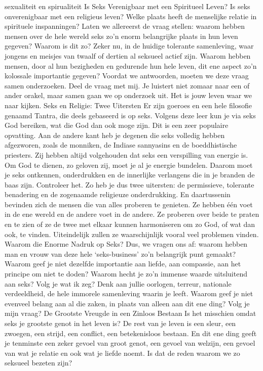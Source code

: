 sexualiteit en spirualiteit
Is Seks Verenigbaar met een Spiritueel Leven?
Is seks onverenigbaar met een religieus leven? Welke plaats heeft de menselijke relatie in spirituele inspanningen?
Laten we allereerst de vraag stellen: waarom hebben mensen over de hele wereld seks zo’n enorm belangrijke plaats in hun leven gegeven? Waarom is dit zo? Zeker nu, in de huidige tolerante samenleving, waar jongens en meisjes van twaalf of dertien al seksueel actief zijn. Waarom hebben mensen, door al hun bezigheden en gedurende hun hele leven, dit ene aspect zo’n kolossale importantie gegeven?
Voordat we antwoorden, moeten we deze vraag samen onderzoeken. Deel de vraag met mij. Je luistert niet zomaar naar een of ander orakel, maar samen gaan we op onderzoek uit. Het is jouw leven waar we naar kijken.
Seks en Religie: Twee Uitersten
Er zijn goeroes en een hele filosofie genaamd Tantra, die deels gebaseerd is op seks. Volgens deze leer kun je via seks God bereiken, wat die God dan ook moge zijn. Dit is een zeer populaire opvatting.
Aan de andere kant heb je degenen die seks volledig hebben afgezworen, zoals de monniken, de Indiase sannyasins en de boeddhistische priesters. Zij hebben altijd volgehouden dat seks een verspilling van energie is. Om God te dienen, zo geloven zij, moet je al je energie bundelen. Daarom moet je seks ontkennen, onderdrukken en de innerlijke verlangens die in je branden de baas zijn. Controleer het.
Zo heb je dus twee uitersten: de permissieve, tolerante benadering en de zogenaamde religieuze onderdrukking. En daartussenin bevinden zich de mensen die van alles proberen te genieten. Ze hebben één voet in de ene wereld en de andere voet in de andere. Ze proberen over beide te praten en te zien of ze de twee met elkaar kunnen harmoniseren om zo God, of wat dan ook, te vinden. Uiteindelijk zullen ze waarschijnlijk vooral veel problemen vinden.
Waarom die Enorme Nadruk op Seks?
Dus, we vragen ons af: waarom hebben man en vrouw van deze hele ‘seks-business’ zo'n belangrijk punt gemaakt? Waarom geef je niet dezelfde importantie aan liefde, aan compassie, aan het principe om niet te doden? Waarom hecht je zo’n immense waarde uitsluitend aan seks?
Volg je wat ik zeg? Denk aan jullie oorlogen, terreur, nationale verdeeldheid, de hele immorele samenleving waarin je leeft. Waarom geef je niet evenveel belang aan al die zaken, in plaats van alleen aan dit ene ding? Volg je mijn vraag?
De Grootste Vreugde in een Zinloos Bestaan
Is het misschien omdat seks je grootste genot in het leven is? De rest van je leven is een sleur, een zwoegen, een strijd, een conflict, een betekenisloos bestaan. En dit ene ding geeft je tenminste een zeker gevoel van groot genot, een gevoel van welzijn, een gevoel van wat je relatie en ook wat je liefde noemt. Is dat de reden waarom we zo seksueel bezeten zijn?
